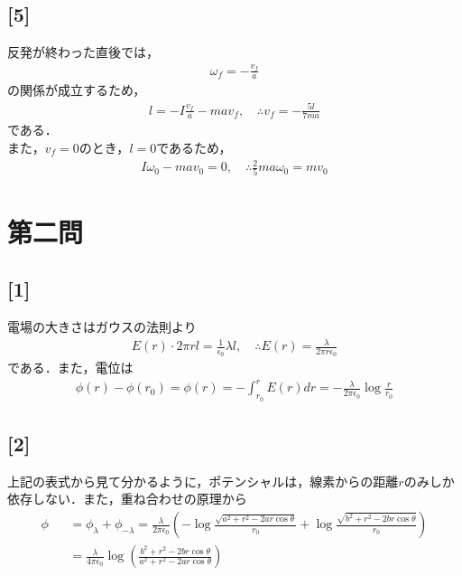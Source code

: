 \documentclass[12pt,dvipdfmx]{jsarticle}
\begin{document}
\subsection*{\large{[5]}}
反発が終わった直後では，
\begin{eqnarray}
  \omega_f = -\frac{v_f}{a}
\end{eqnarray}
の関係が成立するため，
\begin{eqnarray}
  l = -I \frac{v_f}{a} - ma v_f , \quad\therefore v_f = -\frac{5l}{7ma}
\end{eqnarray}
である．\\
また，$v_f=0$のとき，$l=0$であるため，
\begin{eqnarray}
  I\omega_0 -mav_0=0,\quad\therefore \frac{2}{5}ma\omega_0 = mv_0
\end{eqnarray}
\newpage
\section*{\Large{第二問}}
\subsection*{\large{[1]}}
電場の大きさはガウスの法則より
\begin{eqnarray}
  E(r)\cdot 2\pi r l = \frac{1}{\epsilon_0}\lambda l,\quad\therefore E(r) = \frac{\lambda}{2\pi r \epsilon_0}
\end{eqnarray}
である．また，電位は
\begin{eqnarray}
  \phi(r)-\phi(r_0) = \phi(r) = -\int_{r_0}^{r} E(r) dr = -\frac{\lambda}{2\pi\epsilon_0}\log\frac{r}{r_0}
\end{eqnarray}
\subsection*{\large{[2]}}
上記の表式から見て分かるように，ポテンシャルは，線素からの距離$r$のみしか依存しない．また，重ね合わせの原理から
\begin{eqnarray}
  \phi&&= \phi_{\lambda} + \phi_{-\lambda} = \frac{\lambda}{2\pi\epsilon_0}\left( -\log \frac{\sqrt{a^2+r^2-2ar\cos\theta}}{r_0}+\log \frac{\sqrt{b^2+r^2-2br\cos\theta}}{r_0} \right)\\
  &&= \frac{\lambda}{4\pi\epsilon_0}\log\left( \frac{b^2 + r^2 -2br\cos\theta}{a^2 + r^2 -2ar\cos\theta} \right)
\end{eqnarray}
\end{document}
